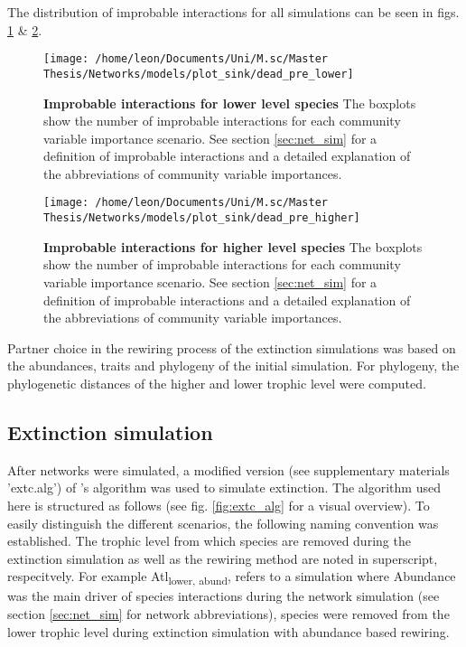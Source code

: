 \documentclass[12pt,a4paper]{article}
\begin{document}
	 
The distribution of improbable interactions for all simulations can be seen in figs. \ref{fig:int_lower} \& \ref{fig:int_higher}. 

\begin{figure}[H]
	 \texttt{[image: /home/leon/Documents/Uni/M.sc/Master Thesis/Networks/models/plot\_sink/dead\_pre\_lower]}
	 \caption{\textbf{Improbable interactions for lower level species} The boxplots show the number of improbable interactions for each community variable importance scenario. See section \ref{sec:net_sim} for a definition of improbable interactions and a detailed explanation of the abbreviations of community variable importances.}
	 \label{fig:int_lower}
\end{figure}

\begin{figure}[H]
	 \texttt{[image: /home/leon/Documents/Uni/M.sc/Master Thesis/Networks/models/plot\_sink/dead\_pre\_higher]}
	 \caption{\textbf{Improbable interactions for higher level species} The boxplots show the number of improbable interactions for each community variable importance scenario. See section \ref{sec:net_sim} for a definition of improbable interactions and a detailed explanation of the abbreviations of community variable importances.}
	 \label{fig:int_higher}
\end{figure}



	Partner choice in the rewiring process of the extinction simulations was based on the abundances, traits and phylogeny of the initial simulation. For phylogeny, the phylogenetic distances of the higher and lower trophic level were computed.
	\subsection{Extinction simulation} \label{sec:extc_sim}
	After networks were simulated, a modified version (see supplementary materials 'extc.alg') of \citeauthor{Vizentin-Bugoni2019}'s algorithm was used to simulate extinction. The algorithm used here is structured as follows (see fig. \ref{fig:extc_alg} for a visual overview). To easily distinguish the different scenarios, the following naming convention was established. The trophic level from which species are removed during the extinction simulation as well as the rewiring method are noted in superscript, respecitvely. For example Atl\textsubscript{lower, abund}, refers to a simulation where Abundance was the main driver of species interactions during the network simulation (see section \ref{sec:net_sim} for network abbreviations), species were removed from the lower trophic level during extinction simulation with abundance based rewiring.
\end{document}
